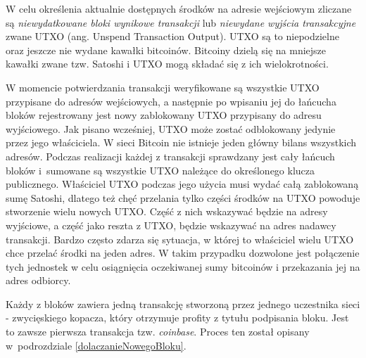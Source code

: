 \documentclass[12pt, twoside, final, openany]{mgr}
\begin{document}
\indent W celu określenia aktualnie dostępnych środków na adresie wejściowym zliczane są \textit{niewydatkowane bloki wynikowe transakcji} lub \textit{niewydane wyjścia transakcyjne} zwane UTXO (ang. Unspend Transaction Output). UTXO są to niepodzielne oraz jeszcze nie wydane kawałki bitcoinów. Bitcoiny dzielą się na mniejsze kawałki zwane tzw. Satoshi i UTXO mogą składać się z ich wielokrotności. 

\indent W momencie potwierdzania transakcji weryfikowane są wszystkie UTXO przypisane do adresów wejściowych, a następnie po wpisaniu jej do łańcucha bloków rejestrowany jest nowy zablokowany UTXO przypisany do adresu wyjściowego. Jak pisano wcześniej, UTXO może zostać odblokowany jedynie przez jego właściciela. W sieci Bitcoin nie istnieje jeden główny bilans wszystkich adresów. Podczas realizacji każdej z transakcji sprawdzany jest cały łańcuch bloków i~sumowane są wszystkie UTXO należące do określonego klucza publicznego. Właściciel UTXO podczas jego użycia musi wydać całą zablokowaną sumę Satoshi, dlatego też chęć przelania tylko części środków na UTXO powoduje stworzenie wielu nowych UTXO. Część z nich wskazywać będzie na adresy wyjściowe, a część jako reszta z UTXO, będzie wskazywać na adres nadawcy transakcji. Bardzo często zdarza się sytuacja, w której to właściciel wielu UTXO chce przelać środki na jeden adres. W takim przypadku dozwolone jest połączenie tych jednostek w celu osiągnięcia oczekiwanej sumy bitcoinów i przekazania jej na adres odbiorcy. 

\indent Każdy z bloków zawiera jedną transakcję stworzoną przez jednego uczestnika sieci - zwycięskiego kopacza, który otrzymuje profity z tytułu podpisania bloku. Jest to zawsze pierwsza transakcja tzw. \textit{coinbase}. Proces ten został opisany w~podrozdziale \ref{dolaczanieNowegoBloku}.
\end{document}
